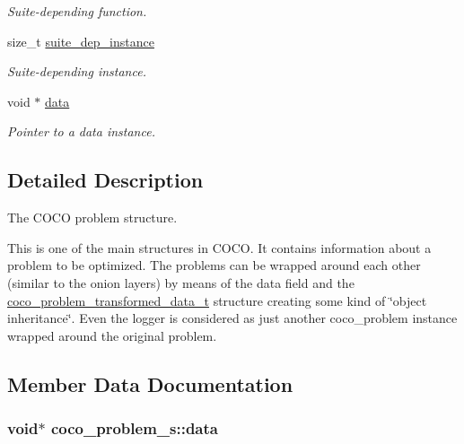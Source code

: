 \begin{DoxyCompactItemize}
\begin{DoxyCompactList}\small\item\em Suite-\/depending function. \end{DoxyCompactList}\item 
size\+\_\+t \hyperlink{structcoco__problem__s_a89175e198bb75a4ec6a45b5fa37ead46}{suite\+\_\+dep\+\_\+instance}\hypertarget{structcoco__problem__s_a89175e198bb75a4ec6a45b5fa37ead46}{}\label{structcoco__problem__s_a89175e198bb75a4ec6a45b5fa37ead46}

\begin{DoxyCompactList}\small\item\em Suite-\/depending instance. \end{DoxyCompactList}\item 
void $\ast$ \hyperlink{structcoco__problem__s_a194c38d671595149b8b60fcac03f7959}{data}
\begin{DoxyCompactList}\small\item\em Pointer to a data instance. \end{DoxyCompactList}\end{DoxyCompactItemize}


\subsection{Detailed Description}
The C\+O\+CO problem structure. 

This is one of the main structures in C\+O\+CO. It contains information about a problem to be optimized. The problems can be wrapped around each other (similar to the onion layers) by means of the data field and the \hyperlink{structcoco__problem__transformed__data__t}{coco\+\_\+problem\+\_\+transformed\+\_\+data\+\_\+t} structure creating some kind of \char`\"{}object inheritance\char`\"{}. Even the logger is considered as just another coco\+\_\+problem instance wrapped around the original problem. 

\subsection{Member Data Documentation}
\subsubsection[{\texorpdfstring{data}{data}}]{\setlength{\rightskip}{0pt plus 5cm}void$\ast$ coco\+\_\+problem\+\_\+s\+::data}\hypertarget{structcoco__problem__s_a194c38d671595149b8b60fcac03f7959}{}\label{structcoco__problem__s_a194c38d671595149b8b60fcac03f7959}


